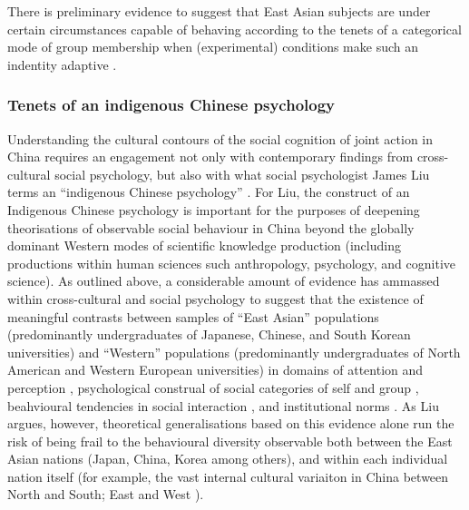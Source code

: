 {There is preliminary evidence to suggest that East Asian subjects are under certain circumstances capable of behaving according to the tenets of a categorical mode of group membership when (experimental) conditions make such an indentity adaptive \citep{Hong2000}.




\subsubsection{Tenets of an indigenous Chinese psychology}
Understanding the cultural contours of the social cognition of joint action in China requires an engagement not only with contemporary findings from cross-cultural social psychology, but also with what social psychologist James Liu terms an ``indigenous Chinese psychology'' \citep{Liu2009}. For Liu, the construct of an Indigenous Chinese psychology is important for the purposes of deepening theorisations of observable social behaviour in China beyond the globally dominant Western modes of scientific knowledge production (including productions within human sciences such anthropology, psychology, and cognitive science).  As outlined above, a considerable amount of evidence has ammassed within cross-cultural and social psychology to suggest that the existence of meaningful contrasts between samples of ``East Asian'' populations (predominantly undergraduates of Japanese, Chinese, and South Korean universities) and ``Western'' populations (predominantly undergraduates of North American and Western European universities) in domains of attention and perception \citep{Peng1997,Nisbett2003}, psychological construal of social categories of self and group \citep{Markus1991}, beahvioural tendencies in social interaction \citep{Yuki2003}, and institutional norms \citep{Liu2017}.  As Liu argues, however, theoretical generalisations based on this evidence alone run the risk of being frail to the behavioural diversity observable both between the East Asian nations (Japan, China, Korea among others), and within each individual nation itself (for example, the vast internal cultural variaiton in China between North and South; East and West \citep[see, for example,][]{Henrich2014}).

}
